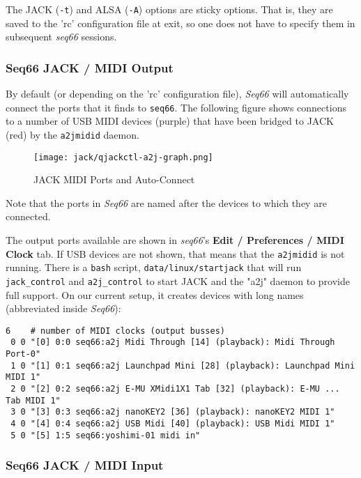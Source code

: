    The JACK (\texttt{-t}) and ALSA (\texttt{-A}) options are sticky options.
   That is, they are saved to the 'rc' configuration file at exit,
   so one does not have to specify them in subsequent \textsl{seq66} sessions.

\subsubsection{Seq66 JACK / MIDI Output}
\label{subsubsec:jack_midi_output}

   By default (or depending on the 'rc' configuration file),
   \textsl{Seq66} will
   automatically connect the ports that it finds to \texttt{seq66}.
   The following figure shows connections to a number of USB MIDI devices
   (purple) that have been bridged to JACK (red) by the \texttt{a2jmidid}
   daemon.

\begin{figure}[H]
   \centering 
   \texttt{[image: jack/qjackctl-a2j-graph.png]}
   \caption{JACK MIDI Ports and Auto-Connect}
   \label{fig:jack_midi_ports_auto_connect}
\end{figure}

   Note that the ports in \textsl{Seq66} are named after the devices to which
   they are connected.

	The output ports available are shown in \textsl{seq66}'s
	\textbf{Edit / Preferences / MIDI Clock} tab.
   If USB devices are not shown, that means
   that the \texttt{a2jmidid} is not running.
   There is a \texttt{bash} script, \texttt{data/linux/startjack}
   that will run \texttt{jack\_control} and \texttt{a2j\_control} to start JACK
   and the "a2j" daemon to provide full support.
   On our current setup, it creates devices with long names (abbreviated inside
   \textsl{Seq66}):

   \begin{verbatim}
6    # number of MIDI clocks (output busses)
 0 0 "[0] 0:0 seq66:a2j Midi Through [14] (playback): Midi Through Port-0"
 1 0 "[1] 0:1 seq66:a2j Launchpad Mini [28] (playback): Launchpad Mini MIDI 1"
 2 0 "[2] 0:2 seq66:a2j E-MU XMidi1X1 Tab [32] (playback): E-MU ... Tab MIDI 1"
 3 0 "[3] 0:3 seq66:a2j nanoKEY2 [36] (playback): nanoKEY2 MIDI 1"
 4 0 "[4] 0:4 seq66:a2j USB Midi [40] (playback): USB Midi MIDI 1"
 5 0 "[5] 1:5 seq66:yoshimi-01 midi in"
   \end{verbatim}

\subsubsection{Seq66 JACK / MIDI Input}
\label{subsubsec:jack_midi_input}

